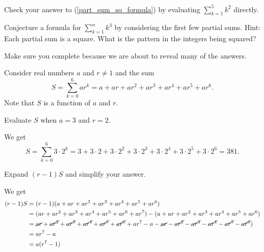 \begin{act}
\begin{apart}
        \item Check your answer to (\ref{part_sum_sq_formula}) by evaluating $\displaystyle \sum_{k=1}^{5}k^2$ directly.

        \item Conjecture a formula for $\displaystyle \sum_{k=1}^nk^3$ by considering the first few partial sums.  Hint:  Each partial sum is a square.  What is the pattern in the integers being squared?
    \end{apart}   
\end{act}

Make sure you complete  because we are about to reveal many of the answers.

\begin{exam}
\label{exam_finite_geom_sum}
    Consider real numbers $a$ and $r \neq 1$ and the sum
        $$S = \sum_{k=0}^6 ar^k = a + ar + ar^2 + ar^3 + ar^4 + ar^5 + ar^ 6.$$
    Note that $S$ is a function of $a$ and $r$.      
        \begin{apart}
            \item \label{part_geom_sum_exam_a3r2} Evaluate $S$ when $a=3$ and $r=2$.
                \begin{soln}
                    We get
                    $$S = \sum_{k=0}^6 3 \cdot 2^k = 3 + 3 \cdot 2 + 3 \cdot 2^2 + 3 \cdot 2^3 + 3 \cdot 2^4 + 3 \cdot 2^5 + 3 \cdot 2^ 6= 381.$$
                \end{soln}
            \item \label{part_rminus1_timesS_general} Expand $(r-1)S$ and simplify your answer.
                \begin{soln}
                    We get
                        \begin{align*}
                            (r-1)S  & = (r-1)(a + ar + ar^2 + ar^3 + ar^4 + ar^5 + ar^ 6) \\
                            & = (ar + ar^2 + ar^3 + ar^4 + ar^5 + ar^6 + ar^ 7) - (a + ar + ar^2 + ar^3 + ar^4 + ar^5 + ar^ 6) \\
                            & = \cancel{ar} + \cancel{ar^2} + \cancel{ar^3} + \cancel{ar^4} + \cancel{ar^5} + \cancel{ar^6} + ar^7 - a - \cancel{ar} - \cancel{ar^2} - \cancel{ar^3} - \cancel{ar^4} - \cancel{ar^5} - \cancel{ar^ 6}) \\
                            & = ar^7-a \\
                            & = a(r^7-1)
                        \end{align*}

\end{soln}
\end{apart}
\end{exam}
